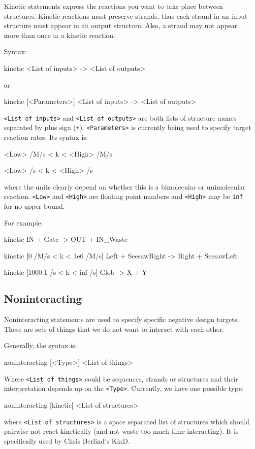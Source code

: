 \documentclass{article}
\newenvironment{code}
{\vspace{-0.1in}\par\begin{list}{}{
\setlength{\listparindent}{0pt}
\raggedright
\setlength{\itemsep}{0pt}
\setlength{\parsep}{0pt}
\normalfont\ttfamily}
 \item[]}
{\end{list}\vspace{-0.1in}}
\begin{document}
Kinetic statements express the reactions you want to take place between
structures. Kinetic reactions must preserve strands, thus each strand
in an input structure must appear in an output structure. Also, a
strand may not appear more than once in a kinetic reaction.

Syntax:
\begin{code}
kinetic <List of inputs> -> <List of outputs>
\end{code}
or
\begin{code}
kinetic [<Parameters>] <List of inputs> -> <List of outputs>
\end{code}
\texttt{<List of inputs>} and \texttt{<List of outputs>} are both lists of structure
names separated by plus sign (\texttt{+}). \texttt{<Parameters>} is currently being
used to specify target reaction rates. Its syntax is:
\begin{code}
<Low> /M/s < k < <High> /M/s

<Low> /s < k < <High> /s
\end{code}
where the units clearly depend on whether this is a bimolecular or
unimolecular reaction. \texttt{<Low>} and \texttt{<High>} are floating point numbers
and \texttt{<High>} may be \texttt{inf} for no upper bound.

For example:
\begin{code}
kinetic IN + Gate -> OUT + IN\_Waste

kinetic [0 /M/s < k < 1e6 /M/s] Left + SeesawRight -> Right + SeesawLeft

kinetic [1000.1 /s < k < inf /s] Glob -> X + Y
\end{code}

\subsection{Noninteracting}

Noninteracting statements are used to specify specific negative design
targets. These are sets of things that we do not want to interact
with each other.

Generally, the syntax is:
\begin{code}
noninteracting [<Type>] <List of things>
\end{code}
Where \texttt{<List of things>} could be sequences, strands or structures and
their interpretation depends up on the \texttt{<Type>}. Currently, we have
one possible type:
\begin{code}
noninteracting [kinetic] <List of structures>
\end{code}
where \texttt{<List of structures>} is a space separated list of structures
which should pairwise not react kinetically (and not waste too much
time interacting). It is specifically used by Chris Berlind's KinD.
\end{document}
